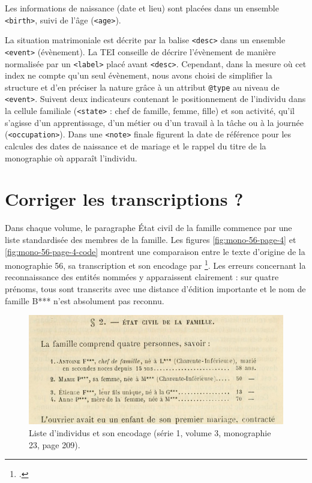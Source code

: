 Les informations de naissance (date et lieu) sont placées dans un ensemble \texttt{<birth>}, suivi de l'âge (\texttt{<age>}).

La situation matrimoniale est décrite par la balise \texttt{<desc>} dans un ensemble \texttt{<event>} (évènement). La TEI conseille de décrire l'évènement de manière normalisée par un \texttt{<label>} placé avant \texttt{<desc>}. Cependant, dans la mesure où cet index ne compte qu'un seul évènement, nous avons choisi de simplifier la structure et d'en préciser la nature grâce à un attribut \texttt{@type} au niveau de \texttt{<event>}. Suivent deux indicateurs contenant le positionnement de l'individu dans la cellule familiale (\texttt{<state>} : chef de famille, femme, fille) et son activité, qu'il s'agisse d'un apprentissage, d'un métier ou d'un travail à la tâche ou à la journée (\texttt{<occupation>}). Dans une \texttt{<note>} finale figurent la date de référence pour les calcules des dates de naissance et de mariage et le rappel du titre de la monographie où apparaît l'individu.

\section{Corriger les transcriptions ?}

Dans chaque volume, le paragraphe \og État civil de la famille \fg{} commence par une liste standardisée des membres de la famille. Les figures \ref{fig:mono-56-page-4} et \ref{fig:mono-56-page-4-code} montrent une comparaison entre le texte d'origine de la monographie 56, sa transcription et son encodage par \lse\footcite[p. 4]{mono056a}. Les erreurs concernant la reconnaissance des entités nommées y apparaissent clairement : sur quatre prénoms, tous sont transcrits avec une distance d'édition importante et le nom de famille \og B*** \fg{} n'est absolument pas reconnu.

\begin{figure}[ht]
    \includegraphics[width=14cm]{img/mono-23-page-209.jpg}
    \caption[Liste d'individus au début du paragraphe 2 (\no{} 23)]{Liste d'individus et son encodage (série 1, volume 3, monographie \no{} 23, page 209).}
    \label{fig:mono-23-page-209}
\end{figure}

